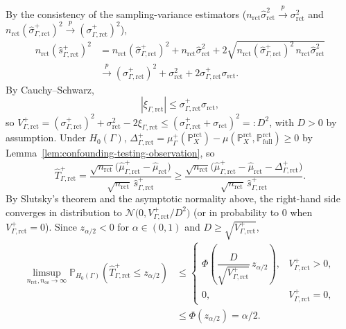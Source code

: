 By the consistency of the sampling-variance estimators (\(n_{\mathrm{rct}}\widehat{\sigma}_{\mathrm{rct}}^2 \xrightarrow{p} \sigma_{\mathrm{rct}}^2\) and \(n_{\mathrm{rct}}(\widehat{\sigma}^+_{\Gamma,\mathrm{rct}})^2 \xrightarrow{p} (\sigma^+_{\Gamma,\mathrm{rct}})^2\)),
\[
\begin{aligned}
  n_{\mathrm{rct}}(\widehat{s}^+_{\Gamma,\mathrm{rct}})^2
  &=
  n_{\mathrm{rct}}(\widehat{\sigma}^+_{\Gamma,\mathrm{rct}})^2
  +
  n_{\mathrm{rct}}\widehat{\sigma}_{\mathrm{rct}}^2
  +
  2\sqrt{n_{\mathrm{rct}}(\widehat{\sigma}^+_{\Gamma,\mathrm{rct}})^2\,n_{\mathrm{rct}}\widehat{\sigma}_{\mathrm{rct}}^2} \\
  &\xrightarrow{p}
  (\sigma^+_{\Gamma,\mathrm{rct}})^2
  +
  \sigma_{\mathrm{rct}}^2
  +
  2\sigma^+_{\Gamma,\mathrm{rct}}\sigma_{\mathrm{rct}}.
\end{aligned}
\]
By Cauchy--Schwarz,
\[
  |\xi_{\Gamma,\mathrm{rct}}|
  \leq
  \sigma^+_{\Gamma,\mathrm{rct}}\sigma_{\mathrm{rct}},
\]
so \(V^+_{\Gamma,\mathrm{rct}} = (\sigma^+_{\Gamma,\mathrm{rct}})^2 + \sigma_{\mathrm{rct}}^2 - 2\xi_{\Gamma,\mathrm{rct}} \leq (\sigma^+_{\Gamma,\mathrm{rct}} + \sigma_{\mathrm{rct}})^2 =: D^2\), with \(D > 0\) by assumption. Under \(H_0(\Gamma)\), \(\Delta^+_{\Gamma,\mathrm{rct}} = \mu^+_{\Gamma}(\mathbb{P}^{\mathrm{rct}}_X) - \mu(\mathbb{P}^{\mathrm{rct}}_X,\mathbb{P}^{\mathrm{rct}}_{\mathrm{full}}) \geq 0\) by Lemma~\ref{lem:confounding-testing-observation}, so
\[
  \widehat{T}^+_{\Gamma,\mathrm{rct}}
  =
  \frac{
    \sqrt{n_{\mathrm{rct}}}\bigl(\widehat{\mu}^+_{\Gamma,\mathrm{rct}} - \widehat{\mu}_{\mathrm{rct}}\bigr)
  }{
    \sqrt{n_{\mathrm{rct}}}\,\widehat{s}^+_{\Gamma,\mathrm{rct}}
  }
  \geq
  \frac{
    \sqrt{n_{\mathrm{rct}}}\bigl(\widehat{\mu}^+_{\Gamma,\mathrm{rct}} - \widehat{\mu}_{\mathrm{rct}} - \Delta^+_{\Gamma,\mathrm{rct}}\bigr)
  }{
    \sqrt{n_{\mathrm{rct}}}\,\widehat{s}^+_{\Gamma,\mathrm{rct}}
  }.
\]
By Slutsky's theorem and the asymptotic normality above, the right-hand side converges in distribution to \(\mathcal{N}\bigl(0, V^+_{\Gamma,\mathrm{rct}}/D^2\bigr)\) (or in probability to \(0\) when \(V^+_{\Gamma,\mathrm{rct}}=0\)). Since \(z_{\alpha/2}<0\) for \(\alpha\in(0,1)\) and \(D \geq \sqrt{V^+_{\Gamma,\mathrm{rct}}}\),
\[
\begin{aligned}
  \limsup_{n_{\mathrm{rct}},n_{\mathrm{os}}\to\infty}
  \mathbb{P}_{H_0(\Gamma)}
  \left(
    \widehat{T}^+_{\Gamma,\mathrm{rct}}
    \leq
    z_{\alpha/2}
  \right)
  &\leq
  \begin{cases}
    \Phi\!\left(\dfrac{D}{\sqrt{V^+_{\Gamma,\mathrm{rct}}}}\,z_{\alpha/2}\right), & V^+_{\Gamma,\mathrm{rct}} > 0, \\
    0, & V^+_{\Gamma,\mathrm{rct}} = 0,
  \end{cases} \\
  &\leq
  \Phi(z_{\alpha/2})
  =
  \alpha/2.
\end{aligned}
\]

